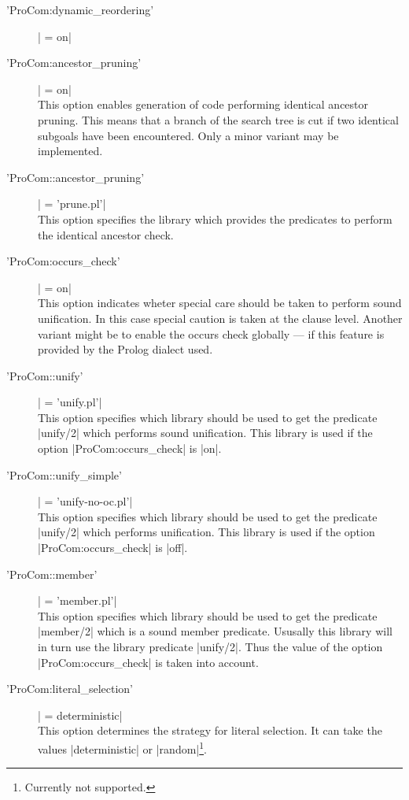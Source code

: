 \begin{description}

  \item ['ProCom:dynamic\_reordering'] | = on|

  \item ['ProCom:ancestor\_pruning'] | = on|
    \\
    This option enables generation of code performing identical ancestor
    pruning. This means that a branch of the search tree is cut if two
    identical subgoals have been encountered. Only a minor variant may be
    implemented.

  \item ['ProCom::ancestor\_pruning'] | = 'prune.pl'|
    \\
    This option specifies the library which provides the predicates to perform
    the identical ancestor check.

  \item ['ProCom:occurs\_check'] | = on|
    \\
    This option indicates wheter special care should be taken to perform sound
    unification. In this case special caution is taken at the clause level.
    Another variant might be to enable the occurs check globally --- if this
    feature is provided by the Prolog dialect used.

  \item ['ProCom::unify'] | = 'unify.pl'|
    \\
    This option specifies which library should be used to get the predicate
    |unify/2| which performs sound unification. This library is used if the
    option  |ProCom:occurs_check| is |on|.

  \item ['ProCom::unify\_simple'] | = 'unify-no-oc.pl'|
    \\
    This option specifies which library should be used to get the predicate
    |unify/2| which performs unification. This library is used if the option
    |ProCom:occurs_check| is |off|.

  \item ['ProCom::member'] | = 'member.pl'|
    \\
    This option specifies which library should be used to get the predicate
    |member/2| which is a sound member predicate. Ususally this library will
    in turn use the library predicate |unify/2|. Thus the value of the option
    |ProCom:occurs_check| is taken into account.

  \item ['ProCom:literal\_selection'] | = deterministic|
    \\
    This option determines the strategy for literal selection. It can take the
    values |deterministic| or |random|\footnote{Currently not supported.}.


\end{description}
